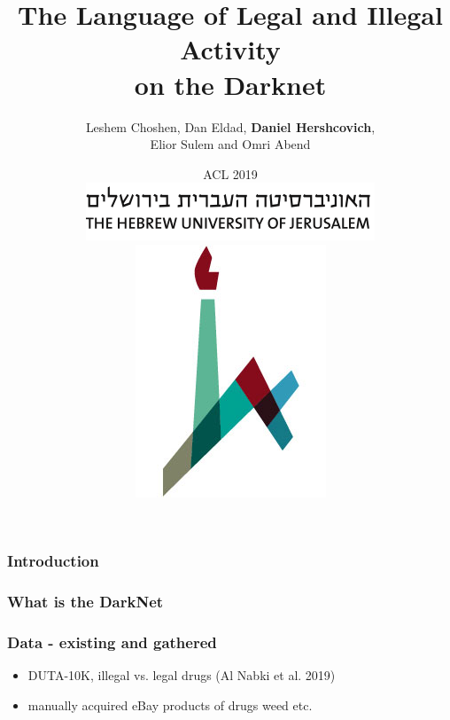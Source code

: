 \documentclass[t,xcolor={svgnames,table}]{beamer}
\begin{document}
\title[]{The Language of Legal and Illegal Activity \\ on the Darknet}
\author[Daniel Hershcovich]{Leshem Choshen, Dan Eldad, \textbf{Daniel Hershcovich}, \\
Elior Sulem and Omri Abend }
\date[]{ACL 2019 \\
	\hspace{0.5cm}
\includegraphics[width=.5\textwidth]{huji_banner.png}
\includegraphics[width=.1\textwidth]{huji_logo.jpg}}

\begin{frame}
\titlepage
\end{frame}

\begin{frame}
\frametitle{Introduction}
\end{frame}

{%
\begin{frame}
	\frametitle{What is the DarkNet}
\end{frame}
}
\begin{frame}
	\frametitle{Data - existing and gathered}
	\begin{itemize}
		\item DUTA-10K, illegal vs. legal drugs (Al Nabki et al. 2019)
		\item manually acquired eBay products of drugs weed etc.
	\end{itemize}
\end{frame}
\end{document}
